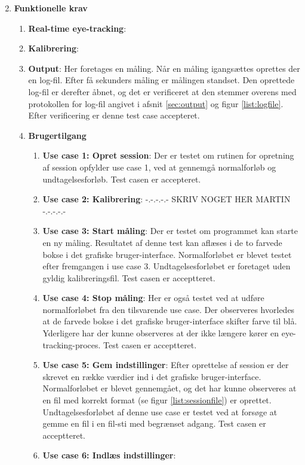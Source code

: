 \documentclass[rapport.tex]{subfiles}
\begin{document}
	\begin{enumerate}
		\setcounter{enumi}{1}
		\item \textbf{Funktionelle krav}
		\begin{enumerate}
			\item \textbf{Real-time eye-tracking}:
			\item \textbf{Kalibrering}:
			\item \textbf{Output}: Her foretages en måling. Når en måling igangsættes oprettes der en log-fil. Efter få sekunders måling er målingen standset. Den oprettede log-fil er derefter åbnet, og det er verificeret at den stemmer overens med protokollen for log-fil angivet i afsnit \ref{sec:output} og figur \ref{list:logfile}. Efter verificering er denne test case accepteret.
			\item \textbf{Brugertilgang}
			\begin{enumerate}
				\item \textbf{Use case 1: Opret session}:
				Der er testet om rutinen for opretning af session opfylder use case 1, ved at gennemgå normalforløb og undtagelsesforløb. Test casen er accepteret. 
				\item \textbf{Use case 2: Kalibrering}:
				-.-.-.-.- SKRIV NOGET HER MARTIN -.-.-.-.-
				\item \textbf{Use case 3: Start måling}:
				Der er testet om programmet kan starte en ny måling. Resultatet af denne test kan aflæses i de to farvede bokse i det grafiske bruger-interface. Normalforløbet er blevet testet efter fremgangen i use case 3. Undtagelsesforløbet er foretaget uden gyldig kalibreringsfil. Test casen er acceptteret. 
				\item \textbf{Use case 4: Stop måling}:
				Her er også testet ved at udføre normalforløbet fra den tilsvarende use case. Der observeres hvorledes at de farvede bokse i det grafiske bruger-interface skifter farve til blå. Yderligere har der kunne observeres at der ikke længere kører en eye-tracking-proces. Test casen er acceptteret. 
				\item \textbf{Use case 5: Gem indstillinger}:
				Efter oprettelse af session er der skrevet en række værdier ind i det grafiske bruger-interface. Normalforløbet er blevet gennemgået, og det har kunne observeres at en fil med korrekt format (se figur \ref{list:sessionfile}) er oprettet. Undtagelsesforløbet af denne use case er testet ved at forsøge at gemme en fil i en fil-sti med begrænset adgang. Test casen er acceptteret. 
				\item \textbf{Use case 6: Indlæs indstillinger}:

\end{enumerate}
\end{enumerate}
\end{enumerate}
\end{document}
